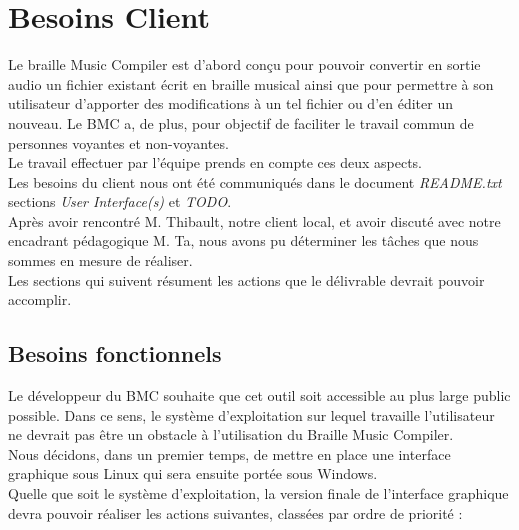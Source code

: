 \chapter{Besoins Client}
Le braille Music Compiler est d'abord conçu pour pouvoir convertir en sortie audio un fichier existant écrit en braille musical ainsi que pour permettre à son utilisateur d'apporter des modifications à un tel fichier ou d'en éditer un nouveau. Le BMC a, de plus, pour objectif de faciliter le travail commun de personnes voyantes et non-voyantes.\\
Le travail effectuer par l'équipe prends en compte ces deux aspects.\\  

Les besoins du client nous ont été communiqués dans le document \textit{README.txt} sections \textit{User Interface(s)} et \textit{TODO}.\\
Après avoir rencontré M. Thibault, notre client local, et avoir discuté avec notre encadrant pédagogique M. Ta, nous avons pu déterminer les tâches que nous sommes en mesure de réaliser. \\

Les sections qui suivent résument les actions que le délivrable devrait pouvoir accomplir. 


\section{Besoins fonctionnels}
Le développeur du BMC souhaite que cet outil soit accessible au plus large public possible. Dans ce sens, le système d'exploitation sur lequel travaille l'utilisateur ne devrait pas être un obstacle à l'utilisation du Braille Music Compiler.\\

Nous décidons, dans un premier temps, de mettre en place une interface graphique sous Linux qui sera ensuite portée sous Windows.\\
 
Quelle que soit le système d'exploitation, la version finale de l'interface graphique devra pouvoir réaliser les actions suivantes, classées par ordre de priorité : \\

